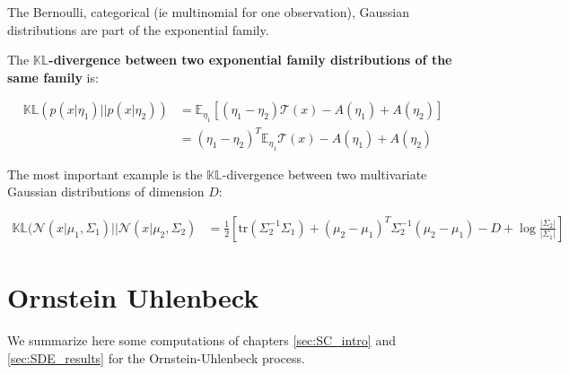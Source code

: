 The Bernoulli, categorical (ie multinomial for one observation), Gaussian distributions are part of the exponential family.

The \textbf{$\mathbb{KL}$-divergence between two exponential family distributions of the same family} is:

\begin{align}
    \mathbb{KL}(p(x\vert \eta_1) \vert \vert p(x \vert \eta_2)) &= \mathbb{E}_{\eta_1}\left[ (\eta_1 - \eta_2) \mathcal{T}(x) - A(\eta_1) + A(\eta_2)\right] \\
    &= (\eta_1 - \eta_2)^T \mathbb{E}_{\eta_1}\mathcal{T}(x) - A(\eta_1) + A(\eta_2)
\end{align}

The most important example is the $\mathbb{KL}$-divergence between two multivariate Gaussian distributions of dimension $D$:

\begin{tcolorbox}[colback=blue!5!white,colframe=black!75!black,title=KL between two multivariate Gaussians of dimension $D$]
\begin{align}
    \label{KL-two-gaussians}
    \mathbb{KL}(\mathcal{N}(x \vert \mu_1, \Sigma_1) \vert\vert \mathcal{N}(x \vert \mu_2, \Sigma_2) &=
    \frac{1}{2}\left[ \text{tr}(\Sigma_2^{-1}\Sigma_1) + (\mu_2-\mu_1)^T \Sigma_2^{-1}(\mu_2-\mu_1) -D + \log{\frac{\vert \Sigma_2\vert}{\vert \Sigma_1 \vert}}\right]
\end{align}
\end{tcolorbox}



\chapter{Ornstein Uhlenbeck}\label{Ornstein Uhlenbeck}

We summarize here some computations of chapters \ref{sec:SC_intro} and \ref{sec:SDE_results} for the Ornstein-Uhlenbeck process.


